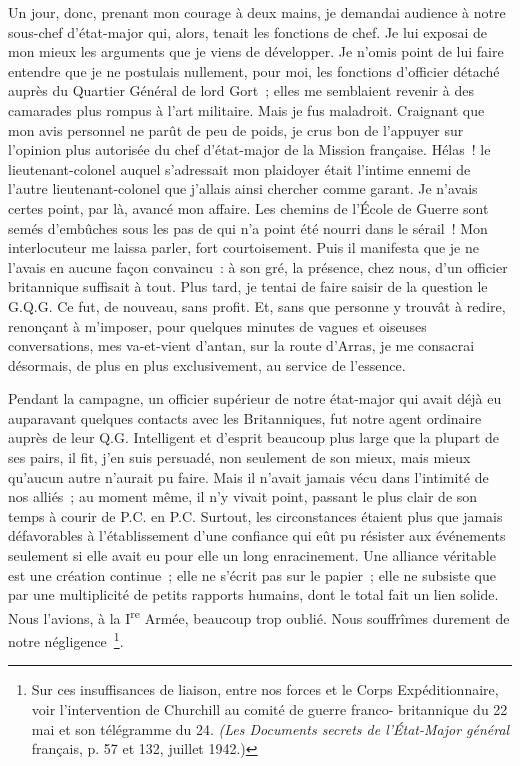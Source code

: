 \documentclass[french,twoside]{book} %
\begin{document}
Un jour, donc, prenant mon courage à deux mains, je demandai audience à notre sous-chef d’état-major qui, alors, tenait les fonctions de chef. Je lui exposai de mon mieux les arguments que je viens de développer. Je n’omis point de lui faire entendre que je ne postulais nullement, pour moi, les fonctions d’officier détaché auprès du Quartier Général de lord Gort ; elles me semblaient revenir à des camarades plus rompus à l’art militaire. Mais je fus maladroit. Craignant que mon avis personnel ne parût de peu de poids, je crus bon de l’appuyer sur l’opinion plus autorisée du chef d’état-major de la Mission française. Hélas ! le lieutenant-colonel auquel s’adressait mon plaidoyer était l’intime ennemi de l’autre lieutenant-colonel que j’allais ainsi chercher comme garant. Je n’avais certes point, par là, avancé mon affaire. Les chemins de l’École de Guerre sont semés d’embûches sous les pas de qui n’a point été nourri dans le sérail ! Mon interlocuteur me laissa parler, fort courtoisement. Puis il manifesta que je ne l’avais en aucune façon convaincu : à son gré, la présence, chez nous, d’un officier britannique suffisait à tout. Plus tard, je tentai de faire saisir de la question le G.Q.G. Ce fut, de nouveau, sans profit. Et, sans que personne y trouvât à redire, renonçant à m’imposer, pour quelques minutes de vagues et oiseuses conversations, mes va-et-vient d’antan, sur la route d’Arras, je me consacrai désormais, de plus en plus exclusivement, au service de l’essence.\par
Pendant la campagne, un officier supérieur de notre état-major qui avait déjà eu auparavant quelques contacts avec les Britanniques, fut notre agent ordinaire auprès de leur Q.G. Intelligent et d’esprit beaucoup plus large que la plupart de ses pairs, il   fit, j’en suis persuadé, non seulement de son mieux, mais mieux qu’aucun autre n’aurait pu faire. Mais il n’avait jamais vécu dans l’intimité de nos alliés ; au moment même, il n’y vivait point, passant le plus clair de son temps à courir de P.C. en P.C. Surtout, les circonstances étaient plus que jamais défavorables à l’établissement d’une confiance qui eût pu résister aux événements seulement si elle avait eu pour elle un long enracinement. Une alliance véritable est une création continue ; elle ne s’écrit pas sur le papier ; elle ne subsiste que par une multiplicité de petits rapports humains, dont le total fait un lien solide. Nous l’avions, à la I\textsuperscript{re} Armée, beaucoup trop oublié. Nous souffrîmes durement de notre négligence \footnote{ Sur ces insuffisances de liaison, entre nos forces et le Corps Expéditionnaire, voir l’intervention de Churchill au comité de guerre franco- britannique du 22 mai et son télégramme du 24. {\itshape (Les Documents secrets de l’État-Major général} français, p. 57 et 132, juillet 1942.)}.\par
\end{document}
